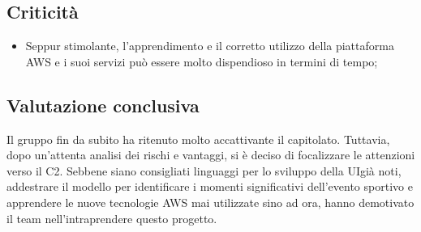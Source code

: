 \subsection{Criticità}
\begin{itemize}
	\item Seppur stimolante, l'apprendimento e il corretto utilizzo della piattaforma AWS e i suoi servizi può essere molto dispendioso in termini di tempo;
	
\end{itemize}

\subsection{Valutazione conclusiva}
Il gruppo fin da subito ha ritenuto molto accattivante il capitolato. Tuttavia, dopo un'attenta analisi dei rischi e vantaggi, si è deciso di focalizzare le attenzioni verso il C2. Sebbene siano consigliati linguaggi per lo sviluppo della UI\glo già noti, addestrare il modello per identificare i momenti significativi dell'evento sportivo e apprendere le nuove tecnologie AWS mai utilizzate sino ad ora, hanno demotivato il team nell'intraprendere questo progetto.